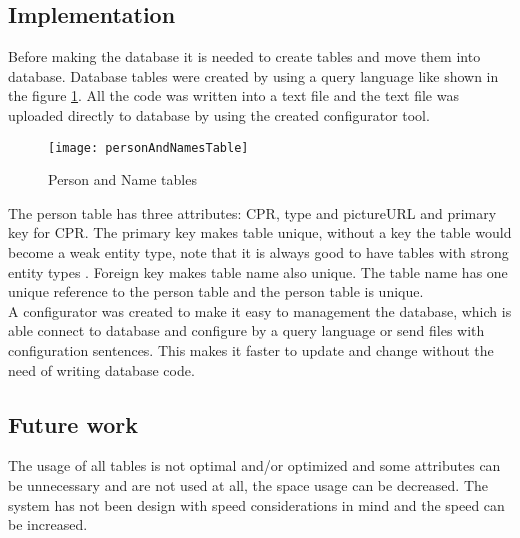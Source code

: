\subsection{Implementation}

Before making the database it is needed to create tables and move them into database. Database tables were created by using a query language like shown in the figure \ref{fig:personAndNamesTable}. All the code was written into a text file and the text file was uploaded directly to database by using the created configurator tool.

\begin{figure}[h]
	\centering
		\texttt{[image: personAndNamesTable]}
	\caption{Person and Name tables}
	\label{fig:personAndNamesTable}
\end{figure}

The person table has three attributes: CPR, type and pictureURL and primary key for CPR. The primary key makes table unique, without a key the table would become a weak entity type, note that it is always good to have tables with strong entity types \cite{bib4}. Foreign key makes table name also unique. The table name has one unique reference to the person table and the person table is unique. \\ A configurator was created to make it easy to management the database, which is able connect to database and configure by a query language or send files with configuration sentences. This makes it faster to update and change without the need of writing database code. 

\subsection{Future work}

The usage of all tables is not optimal and/or optimized and some attributes can be unnecessary and are not used at all, the space usage can be decreased. The system has not been design with speed considerations in mind and the speed can be increased.